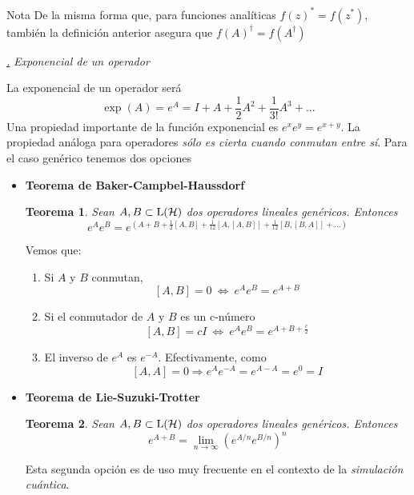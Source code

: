 \documentclass[a4paper,11pt]{book} %
\newtheorem{teorema_contador}{Teorema}
\newcommand{\Teorema}[1]{
		\begin{mybox_gray2}{}
			\begin{teorema_contador}
				 #1 
			\end{teorema_contador} 
		\end{mybox_gray2}
	}
\numberwithin{equation}{chapter}
\def\subsubiContadorIt{\par\addtocounter{subsubsection}{1}\underline{\it\thesubsubsection.}\hskip0.5cm \setcounter{subsubsubsectionIt}{0}}
\newcommand{\SubsubiIt}[1]{
		\subsubiContadorIt \textit{#1}
	}
\newcounter{subsubsubsectionIt}[subsubsection]
\begin{document}
\begin{mybox_blue}{Nota}
De la misma forma que, para funciones analíticas $f(z)^* = f(z^*)$, también la definición anterior asegura que $f(A)^\dagger = f(A^\dagger)$
\end{mybox_blue}


			\SubsubiIt{Exponencial de un operador}

La exponencial de un operador será
	\begin{equation}
	\exp(A) = e^A = I + A + \frac{1}{2} A^2 + \frac{1}{3!} A^3 + ...
	\end{equation}
Una propiedad importante de la función exponencial es  $e^xe^y = e^{x+y}$. La propiedad análoga para operadores \textit{sólo es cierta cuando conmutan entre sí}. Para el caso genérico tenemos dos opciones
\begin{itemize}
	\item \textbf{Teorema de Baker-Campbel-Haussdorf}
	\Teorema{
	Sean $A,B\subset{\rm L}(\mathcal{H})$ dos operadores lineales genéricos. Entonces
		\begin{equation}
	e^A e^B = e^{\left({A+B + \frac{1}{2}[A,B] + \frac{1}{12}[A,[A,B]]+ \frac{1}{12}[B,[B,A]] + ...}\right)}
		\end{equation}
	}

	Vemos que:
	\begin{enumerate}
		\item Si $A$ y $B$ conmutan, 
		$$[A,B]=0 ~\Leftrightarrow ~e^A e^B = e^{A+B}$$
		
		\item Si el conmutador de $A$ y $B$  es un c-número 
		$$[A,B]= c I  ~\Leftrightarrow ~  e^A e^B = e^{A+B + \frac{c}{2}}$$
		
		\item El inverso de $e^A$ es $e^{-A}$. Efectivamente, como 
		$$[A,A]=0 \Rightarrow e^A e^{-A} = e^{A-A} = e^0 = I$$

	\end{enumerate}
	
	\item \textbf{Teorema de Lie-Suzuki-Trotter}
	
	\Teorema{
	Sean $A,B\subset{\rm L}(\mathcal{H})$ dos operadores lineales genéricos. Entonces
		\begin{equation}
		e^{A+B} = \lim_{n\to\infty} \left(e^{{A/n}} e^{B/n}\right)^n
		\end{equation}
	}
	Esta segunda opción es de uso muy frecuente en el contexto de la \textit{simulación cuántica}. 
\end{itemize}
\end{document}
